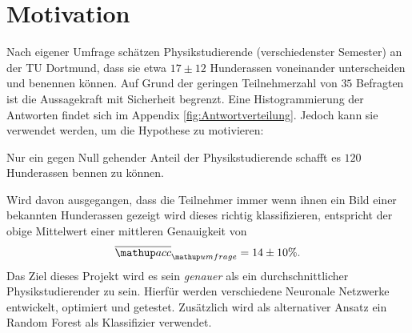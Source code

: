 \setcounter{page}{1}
\section*{Motivation}
Nach eigener Umfrage schätzen Physikstudierende (verschiedenster Semester)
an der TU Dortmund, dass sie etwa $17 \pm 12$ Hunderassen voneinander
unterscheiden und benennen können.
Auf Grund der geringen Teilnehmerzahl von $35$ Befragten
ist die Aussagekraft mit Sicherheit begrenzt. Eine Histogrammierung
der Antworten findet sich im Appendix \ref{fig:Antwortverteilung}.
Jedoch kann sie verwendet werden, um die Hypothese zu motivieren:
\begin{center}
  Nur ein gegen Null gehender Anteil der Physikstudierende schafft es $120$
  Hunderassen bennen zu können.
\end{center}
Wird davon ausgegangen, dass die Teilnehmer immer wenn ihnen ein Bild einer bekannten
Hunderassen gezeigt wird dieses richtig klassifizieren,
entspricht der obige Mittelwert einer mittleren Genauigkeit von
\begin{equation}
  \label{eq:umfrage_mittlere_genauigkeit}
  \ov{\map{acc}}\ua{umfrage} = 14 \pm 10 \%.
\end{equation}
Das Ziel dieses Projekt wird es sein \emph{genauer} als ein durchschnittlicher
Physikstudierender zu sein.
Hierfür werden verschiedene Neuronale Netzwerke entwickelt, optimiert und getestet.
Zusätzlich wird als alternativer Ansatz ein Random Forest als Klassifizier verwendet.
